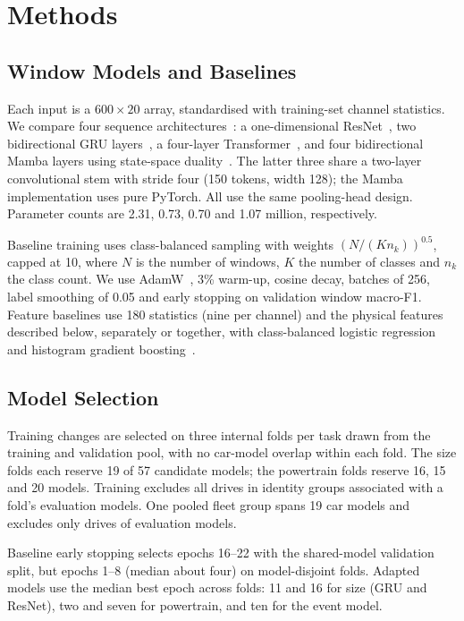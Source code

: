 \section{Methods}\label{sec:methods}
\subsection{Window Models and Baselines}
Each input is a $600\times20$ array, standardised with training-set channel statistics. We compare four sequence architectures~\cite{wang2017tsc,ismailfawaz2019review}: a one-dimensional ResNet~\cite{wang2017tsc}, two bidirectional GRU layers~\cite{cho2014gru}, a four-layer Transformer~\cite{vaswani2017attention}, and four bidirectional Mamba layers using state-space duality~\cite{gu2023mamba,dao2024mamba2}. The latter three share a two-layer convolutional stem with stride four (150 tokens, width 128); the Mamba implementation uses pure PyTorch. All use the same pooling-head design. Parameter counts are 2.31, 0.73, 0.70 and 1.07 million, respectively.

Baseline training uses class-balanced sampling with weights $(N/(Kn_k))^{0.5}$, capped at 10, where $N$ is the number of windows, $K$ the number of classes and $n_k$ the class count. We use AdamW~\cite{loshchilov2019adamw}, 3\% warm-up, cosine decay, batches of 256, label smoothing of 0.05 and early stopping on validation window macro-F1. Feature baselines use 180 statistics (nine per channel) and the physical features described below, separately or together, with class-balanced logistic regression and histogram gradient boosting~\cite{pedregosa2011sklearn,ke2017lightgbm}.

\subsection{Model Selection}
Training changes are selected on three internal folds per task drawn from the training and validation pool, with no car-model overlap within each fold. The size folds each reserve 19 of 57 candidate models; the powertrain folds reserve 16, 15 and 20 models. Training excludes all drives in identity groups associated with a fold's evaluation models. One pooled fleet group spans 19 car models and excludes only drives of evaluation models.

Baseline early stopping selects epochs 16--22 with the shared-model validation split, but epochs 1--8 (median about four) on model-disjoint folds. Adapted models use the median best epoch across folds: 11 and 16 for size (GRU and ResNet), two and seven for powertrain, and ten for the event model.

